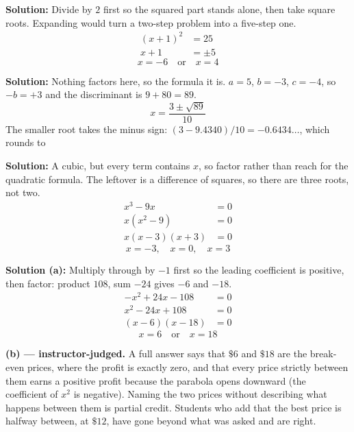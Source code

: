 \documentclass[12pt]{article}
\begin{document}
\textbf{Solution:} Divide by $2$ first so the squared part stands alone, then take square roots. Expanding would turn a two-step problem into a five-step one.
\begin{align*}
  (x+1)^2 &= 25 \\
  x + 1 &= \pm 5
\end{align*}
\[ \boxed{x = -6 \quad \text{or} \quad x = 4} \]


\textbf{Solution:} Nothing factors here, so the formula it is. $a = 5$, $b = -3$, $c = -4$, so $-b = +3$ and the discriminant is $9 + 80 = 89$.
\[ x = \frac{3 \pm \sqrt{89}}{10} \]
The smaller root takes the minus sign: $(3 - 9.4340)/10 = -0.6434\ldots$, which rounds to 


\textbf{Solution:} A cubic, but every term contains $x$, so factor rather than reach for the quadratic formula. The leftover is a difference of squares, so there are three roots, not two.
\begin{align*}
  x^3 - 9x &= 0 \\
  x(x^2 - 9) &= 0 \\
  x(x-3)(x+3) &= 0
\end{align*}
\[ \boxed{x = -3, \quad x = 0, \quad x = 3} \]


\textbf{Solution (a):} Multiply through by $-1$ first so the leading coefficient is positive, then factor: product $108$, sum $-24$ gives $-6$ and $-18$.
\begin{align*}
  -x^2 + 24x - 108 &= 0 \\
  x^2 - 24x + 108 &= 0 \\
  (x-6)(x-18) &= 0
\end{align*}
\[ \boxed{x = 6 \quad \text{or} \quad x = 18} \]

\textbf{(b) --- instructor-judged.} A full answer says that $\$6$ and $\$18$ are the break-even prices, where the profit is exactly zero, and that every price strictly between them earns a positive profit because the parabola opens downward (the coefficient of $x^2$ is negative). Naming the two prices without describing what happens between them is partial credit. Students who add that the best price is halfway between, at $\$12$, have gone beyond what was asked and are right.
\end{document}
